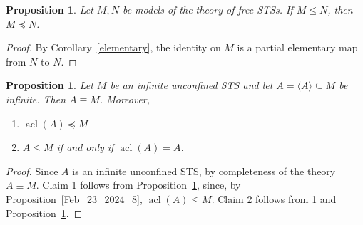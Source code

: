 \documentclass[a4paper, 11pt]{article}
\DeclareMathOperator{\cl}{cl}
\DeclareMathOperator{\acl}{acl}
\DeclareMathOperator{\tp}{tp}
\theoremstyle{note}
\newtheorem{prop}[thm]{Proposition}
\begin{document}
	
	\begin{prop}\label{April_11_2024_6}
		Let $M,N$ be models of the theory of free STSs. If $M\leq N$, then  $M\preccurlyeq N$.
	\end{prop}
	\begin{proof}   %
By Corollary~\ref{elementary}, the identity on $M$ is a partial elementary map from $N$ to $N$.
	\end{proof}
	
	\begin{prop}\label{acl} Let $M$ be an infinite unconfined STS and let $A =\langle A\rangle \subseteq M$ be infinite.  Then $A\equiv M$. Moreover,
		\begin{enumerate}
			\item $\acl(A)\preceq M$
			\item $A \leq M$ if and only if $ \acl(A)=A$.
		\end{enumerate}
	\end{prop}
	\begin{proof} Since $A$ is an infinite unconfined STS, by completeness of the theory $A\equiv M$.
	Claim 1 follows from Proposition~\ref{April_11_2024_6}, since, by Proposition~\ref{Feb_23_2024_8},  $\acl(A)\leq M$.
	Claim 2  follows from 1 and Proposition~\ref{April_11_2024_6}.
	\end{proof}
	
\end{document}
